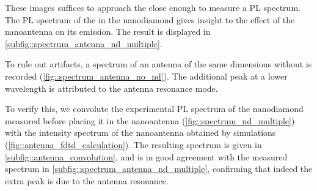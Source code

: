 			These images suffices to approach the \nd close enough to measure a PL spectrum.
			The PL spectrum of the \siv in the nanodiamond gives insight to the effect of the nanoantenna on its emission.
			The result is displayed in \autoref{subfig::spectrum_antenna_nd_multiple}.

			To rule out artifacts, a spectrum of an antenna of the same dimensions without \nd is recorded (\autoref{fig::spectrum_antenna_no_nd}).
			The additional peak at a lower wavelength is attributed to the antenna resonance mode.

			\begin{figure}[tp]
				\centering
				\caption{}
				\label{fig::spectrum_antenna_no_nd}
			\end{figure}


			To verify this, we convolute the experimental PL spectrum of the nanodiamond measured before placing it in the nanoantenna (\autoref{fig::spectrum_nd_multiple}) with the intensity spectrum of the nanoantenna obtained by simulations (\autoref{fig::antenna_fdtd_calculation}).
			The resulting spectrum is given in \autoref{subfig::antenna_convolution}, and is in good agreement with the measured spectrum in \autoref{subfig::spectrum_antenna_nd_multiple}, confirming that indeed the extra peak is due to the antenna resonance.

